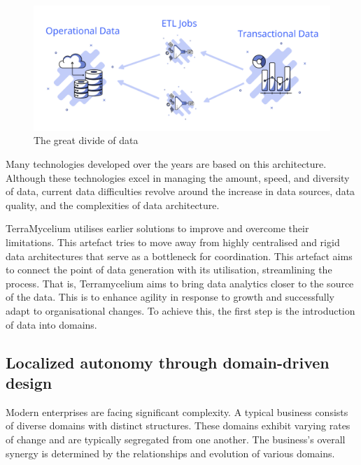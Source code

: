 \documentclass[preprint,12pt]{elsarticle}
\begin{document}
\begin{figure}[ht]

  \centering

  \includegraphics[width=\linewidth]{images/data-planes.png}

  \caption{The great divide of data}

  \label{fig:dataPlanes}

\end{figure}

Many technologies developed over the years are based on this architecture. Although these technologies excel in managing the amount, speed, and diversity of data, current data difficulties revolve around the increase in data sources, data quality, and the complexities of data architecture. 



TerraMycelium utilises earlier solutions to improve and overcome their limitations. This artefact tries to move away from highly centralised and rigid data architectures that serve as a bottleneck for coordination. This artefact aims to connect the point of data generation with its utilisation, streamlining the process. That is, Terramycelium aims to bring data analytics closer to the source of the data. This is to enhance agility in response to growth and successfully adapt to organisational changes. To achieve this, the first step is the introduction of data into domains. 

\subsection{Localized autonomy through domain-driven design}

Modern enterprises are facing significant complexity. A typical business consists of diverse domains with distinct structures. These domains exhibit varying rates of change and are typically segregated from one another. The business's overall synergy is determined by the relationships and evolution of various domains. 
\end{document}
